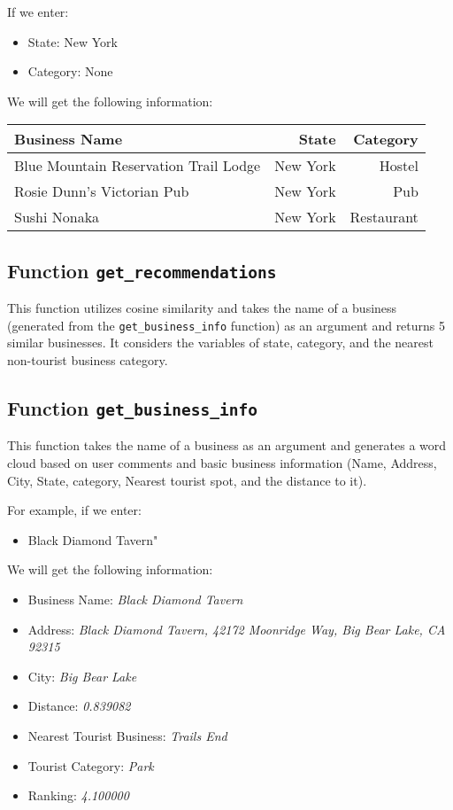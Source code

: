 \documentclass[12pt]{article}
\begin{document}
If we enter:
\begin{itemize}
    \item State: New York
    \item Category: None
\end{itemize}

We will get the following information:

\begin{tabular}{|l|r|r|}
\hline
Business Name & State & Category \\
\hline
Blue Mountain Reservation Trail Lodge & New York & Hostel \\
Rosie Dunn's Victorian Pub & New York & Pub \\
Sushi Nonaka & New York & Restaurant \\
\hline
\end{tabular}


\subsection{Function \texttt{get\_recommendations}}

This function utilizes cosine similarity and takes the name of a business (generated from the \texttt{get\_business\_info} function) as an argument and returns 5 similar businesses. It considers the variables of state, category, and the nearest non-tourist business category.

\subsection{Function \texttt{get\_business\_info}}

This function takes the name of a business as an argument and generates a word cloud based on user comments and basic business information (Name, Address, City, State, category, Nearest tourist spot, and the distance to it).

For example, if we enter:
\begin{itemize}
    \item Black Diamond Tavern"
\end{itemize}

We will get the following information:

\begin{itemize}
    \item Business Name: \textit{Black Diamond Tavern}
    \item Address: \textit{Black Diamond Tavern, 42172 Moonridge Way, Big Bear Lake, CA 92315}
    \item City: \textit{Big Bear Lake}
    \item Distance: \textit{0.839082}
    \item Nearest Tourist Business: \textit{Trails End}
    \item Tourist Category: \textit{Park}
    \item Ranking: \textit{4.100000}
\end{itemize}
\end{document}
